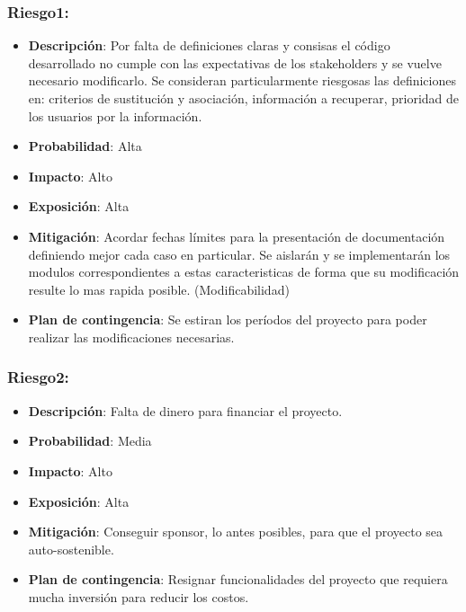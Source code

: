 \subsubsection{Riesgo1:}

\begin{itemize}
\itemsep1pt\parskip0pt
\item
  \textbf{Descripción}: Por falta de definiciones claras y consisas el
  código desarrollado no cumple con las expectativas de los stakeholders
  y se vuelve necesario modificarlo. Se consideran particularmente
  riesgosas las definiciones en: criterios de sustitución y asociación,
  información a recuperar, prioridad de los usuarios por la información.
\item
  \textbf{Probabilidad}: Alta
\item
  \textbf{Impacto}: Alto
\item
  \textbf{Exposición}: Alta
\item
  \textbf{Mitigación}: Acordar fechas límites para la presentación de
  documentación definiendo mejor cada caso en particular. Se aislarán y
  se implementarán los modulos correspondientes a estas caracteristicas
  de forma que su modificación resulte lo mas rapida posible.
  (Modificabilidad)
\item
  \textbf{Plan de contingencia}: Se estiran los períodos del proyecto
  para poder realizar las modificaciones necesarias.
\end{itemize}

\subsubsection{Riesgo2:}

\begin{itemize}
\itemsep1pt\parskip0pt
\item
  \textbf{Descripción}: Falta de dinero para financiar el proyecto.
\item
  \textbf{Probabilidad}: Media
\item
  \textbf{Impacto}: Alto
\item
  \textbf{Exposición}: Alta
\item
  \textbf{Mitigación}: Conseguir sponsor, lo antes posibles, para que el
  proyecto sea auto-sostenible.
\item
  \textbf{Plan de contingencia}: Resignar funcionalidades del proyecto
  que requiera mucha inversión para reducir los costos.
\end{itemize}

